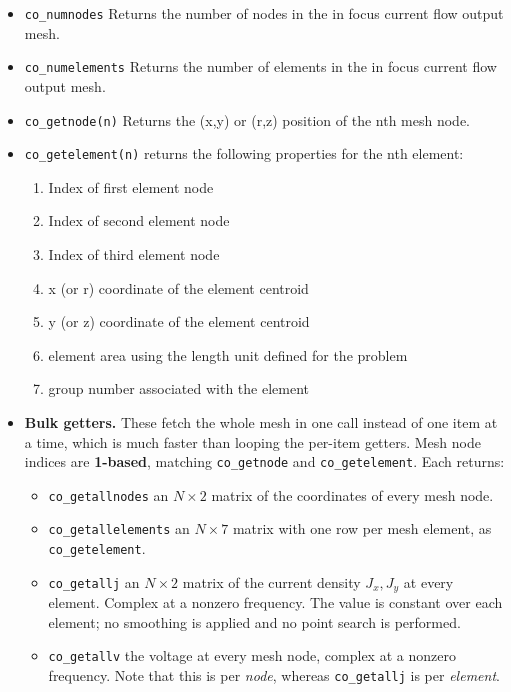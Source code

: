 \begin{itemize}
\item{\tt co\_numnodes} Returns the number of nodes in the in focus current flow output mesh.
\item{\tt co\_numelements} Returns the number of elements in the in focus current flow output mesh.
\item{\tt co\_getnode(n)} Returns the (x,y) or (r,z) position of the nth mesh node.
\item{\tt co\_getelement(n)} returns the following properties for the nth element:
    \begin{enumerate}
        \item Index of first element node
        \item Index of second element node
        \item Index of third element node
        \item x (or r) coordinate of the element centroid
        \item y (or z) coordinate of the element centroid
        \item element area using the length unit defined for the problem
        \item group number associated with the element
    \end{enumerate}


\item {\bf Bulk getters.}  These fetch the whole mesh in one call instead of one item at a time, which is much faster than looping the per-item getters.  Mesh node indices are {\bf 1-based}, matching {\tt co\_getnode} and {\tt co\_getelement}.  Each returns:

\begin{itemize}
\item{\tt co\_getallnodes} an $N \times 2$ matrix of the coordinates of every mesh node.
\item{\tt co\_getallelements} an $N \times 7$ matrix with one row per mesh element, as {\tt co\_getelement}.
\item{\tt co\_getallj} an $N \times 2$ matrix of the current density $J_x, J_y$ at every element. Complex at a nonzero frequency. The value is constant over each element; no smoothing is applied and no point search is performed.
\item{\tt co\_getallv} the voltage at every mesh node, complex at a nonzero frequency. Note that this is per {\em node}, whereas {\tt co\_getallj} is per {\em element}.
\end{itemize}

\end{itemize}
